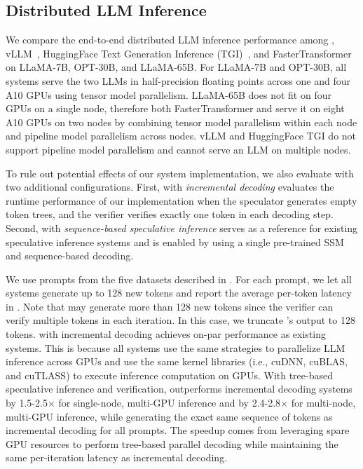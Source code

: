 \subsection{Distributed LLM Inference}
\label{specinfer:subsec:eval_distributed}
We compare the end-to-end distributed LLM inference performance among \SpecInfer, vLLM~\cite{vllm}, HuggingFace Text Generation Inference (TGI)~\cite{huggingface_tgi}, and FasterTransformer~\cite{fastertransformer} on LLaMA-7B, OPT-30B, and LLaMA-65B.
For LLaMA-7B and OPT-30B, all systems serve the two LLMs in half-precision floating points across one and four A10 GPUs using tensor model parallelism.
LLaMA-65B does not fit on four GPUs on a single node, therefore both FasterTransformer and \SpecInfer serve it on eight A10 GPUs on two nodes by combining tensor model parallelism within each node and pipeline model parallelism across nodes.
vLLM and HuggingFace TGI do not support pipeline model parallelism and cannot serve an LLM on multiple nodes.

To rule out potential effects of our system implementation, we also evaluate \SpecInfer with two additional configurations. First, \SpecInfer with {\em incremental decoding} evaluates the runtime performance of our implementation when the speculator generates empty token trees, and the verifier verifies exactly one token in each decoding step.
Second, \SpecInfer with {\em sequence-based speculative inference} serves as a reference for existing speculative inference systems and is enabled by using a single pre-trained SSM and sequence-based decoding.

We use prompts from the five datasets described in . For each prompt, we let all systems generate up to 128 new tokens and report the average per-token latency in .
Note that \SpecInfer may generate more than 128 new tokens since the verifier can verify multiple tokens in each iteration.
In this case, we truncate \SpecInfer's output to 128 tokens.
\SpecInfer with incremental decoding achieves on-par performance as existing systems. This is because all systems use the same strategies to parallelize LLM inference across GPUs and use the same kernel libraries (i.e., cuDNN, cuBLAS, and cuTLASS) to execute inference computation on GPUs.
With tree-based speculative inference and verification, \SpecInfer outperforms incremental decoding systems by 1.5-2.5$\times$ for single-node, multi-GPU inference and by 2.4-2.8$\times$ for multi-node, multi-GPU inference, while generating the exact same sequence of tokens as incremental decoding for all prompts.
The speedup comes from leveraging spare GPU resources to perform tree-based parallel decoding while maintaining the same per-iteration latency as incremental decoding.

